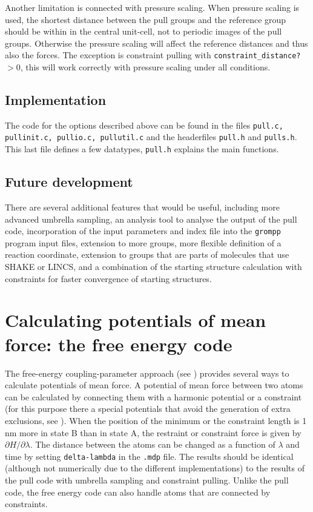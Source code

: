 Another limitation is connected with pressure scaling.
When pressure scaling is used, the shortest distance between the pull
groups and the reference group should be within in the central unit-cell,
not to periodic images of the pull groups.
Otherwise the pressure scaling will affect the reference distances
and thus also the forces.
The exception is constraint pulling with {\tt constraint\_distance?} $> 0$,
this will work correctly with pressure scaling under all conditions.

\subsection{Implementation}

The code for the options described above can be found in the files
{\tt pull.c, pullinit.c, pullio.c, pullutil.c} and the headerfiles
{\tt pull.h} and {\tt pulls.h}. This last file defines a few
datatypes, {\tt pull.h} explains the main functions. 

\subsection{Future development}
There are several additional features that would be useful, including
more advanced umbrella sampling, an analysis tool to analyse the
output of the pull code, incorporation of the input parameters and
index file into the {\tt grompp} program input files, extension to more
groups, more flexible definition of a reaction coordinate, extension
to groups that are parts of molecules that use SHAKE or LINCS, and a
combination of the starting structure calculation with constraints for
faster convergence of starting structures.

\section{Calculating potentials of mean force: the free energy code}
\label{sec:fepmf}
The free-energy coupling-parameter approach (see )
provides several ways to calculate potentials of mean force.
A potential of mean force between two atoms can be calculated
by connecting them with a harmonic potential or a constraint
(for this purpose there a special potentials that avoid the generation of
extra exclusions, see ).
When the position of the minimum or the constraint length is 1 nm more
in state B than in state A, the restraint or constraint force is given
by $\partial H/\partial \lambda$.
The distance between the atoms can be changed as a function of $\lambda$
and time by setting {\tt delta-lambda} in the {\tt .mdp} file.
The results should be identical (although not numerically
due to the different implementations) to the results of the pull code
with umbrella sampling and constraint pulling.
Unlike the pull code, the free energy code can also handle atoms that
are connected by constraints.

